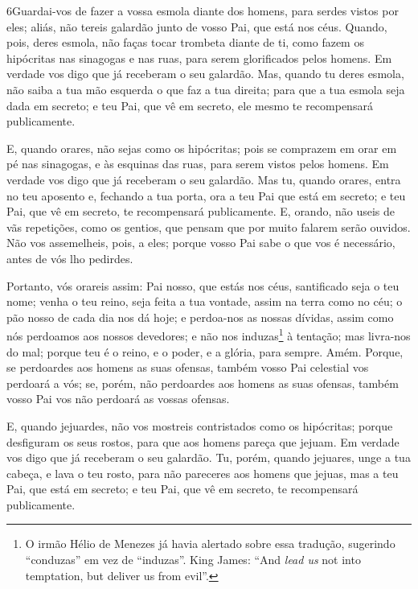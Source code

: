\medskip

\lettrine{6} Guardai-vos de fazer a vossa esmola diante dos
homens, para serdes vistos por eles; aliás, não tereis galardão
junto de vosso Pai, que está nos céus. Quando, pois, deres
esmola, não faças tocar trombeta diante de ti, como fazem os
hipócritas nas sinagogas e nas ruas, para serem glorificados pelos
homens. Em verdade vos digo que já receberam o seu galardão.
Mas, quando tu deres esmola, não saiba a tua mão esquerda o que
faz a tua direita; para que a tua esmola seja dada em secreto; e
teu Pai, que vê em secreto, ele mesmo te recompensará publicamente.

E, quando orares, não sejas como os hipócritas; pois se comprazem
em orar em pé nas sinagogas, e às esquinas das ruas, para serem
vistos pelos homens. Em verdade vos digo que já receberam o seu
galardão. Mas tu, quando orares, entra no teu aposento e,
fechando a tua porta, ora a teu Pai que está em secreto; e teu Pai,
que vê em secreto, te recompensará publicamente. E, orando, não
useis de vãs repetições, como os gentios, que pensam que por muito
falarem serão ouvidos. Não vos assemelheis, pois, a eles; porque
vosso Pai sabe o que vos é necessário, antes de vós lho pedirdes.

Portanto, vós orareis assim: Pai nosso, que estás nos céus,
santificado seja o teu nome; venha o teu reino, seja feita a
tua vontade, assim na terra como no céu; o pão nosso de cada
dia nos dá hoje; e perdoa-nos as nossas dívidas, assim como
nós perdoamos aos nossos devedores; e não nos
induzas\footnote{O irmão Hélio de Menezes já havia alertado sobre
essa tradução, sugerindo ``conduzas'' em vez de ``induzas''. King
James: ``And \emph{lead us} not into temptation, but deliver us from
evil''.} à tentação; mas livra-nos do mal; porque teu é o reino, e o
poder, e a glória, para sempre. Amém. Porque, se perdoardes
aos homens as suas ofensas, também vosso Pai celestial vos perdoará
a vós; se, porém, não perdoardes aos homens as suas ofensas,
também vosso Pai vos não perdoará as vossas ofensas.

E, quando jejuardes, não vos mostreis contristados como os
hipócritas; porque desfiguram os seus rostos, para que aos homens
pareça que jejuam. Em verdade vos digo que já receberam o seu
galardão. Tu, porém, quando jejuares, unge a tua cabeça, e
lava o teu rosto, para não pareceres aos homens que jejuas,
mas a teu Pai, que está em secreto; e teu Pai, que vê em secreto, te
recompensará publicamente.

